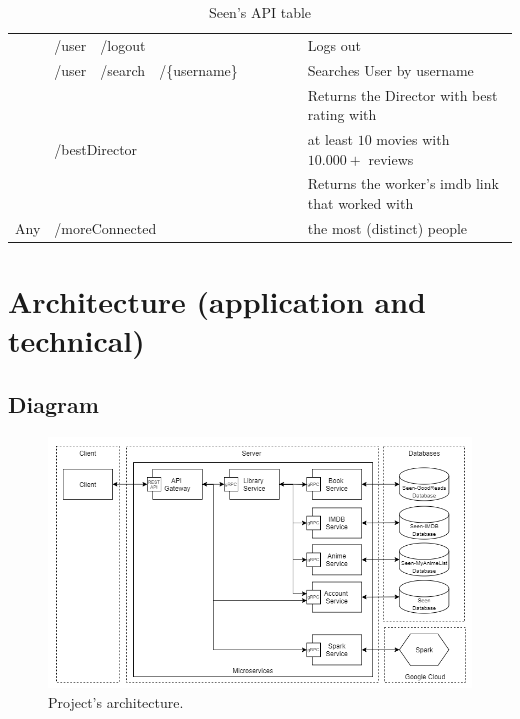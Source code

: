 \documentclass[oneside]{article}
\newcommand{\xmark}{\ding{53}} %
\begin{document}
\begin{table}[H]
\begin{adjustbox}{width=1.4\textwidth}
\begin{tabular}{ c|l l l l|c|c|c|c|l }
    & /user & \multicolumn{3}{l|}{/logout} &
    \xmark & & & &
    Logs out
    \\ \hhline{-|----|-|-|-|-|~}
    & /user & /search & \multicolumn{2}{l|}{/\{username\}} &
    \xmark & & & &
    Searches User by username
    \\ 
    & \multicolumn{4}{l|}{} &
     & & & &
    Returns the Director with best rating with \\
    & \multicolumn{4}{l|}{\multirow{-2}{*}{/bestDirector}} &
    \multirow{-2}{*}{\xmark}
     & & & &
    at least $10$ movies with $10.000+$ reviews
    \\ 
    & \multicolumn{4}{l|}{} &
     & & & &
    Returns the worker's imdb link that worked with \\
    \multirow{-5}{*}{Any} 
    & \multicolumn{4}{l|}{\multirow{-2}{*}{/moreConnected}} &
    \multirow{-2}{*}{\xmark} & & & &
    the most (distinct) people
  \end{tabular}
  \end{adjustbox}
  \caption{Seen's API table}
\end{table}

\section{Architecture (application and technical)}
\label{sec:architecture}
  \subsection{Diagram}
  \begin{figure}[H]
    \centering
    \includegraphics[width=\textwidth]{ CloudNativeAppArchitecture.png }
    \caption{Project's architecture.}
    \label{img:architecture}
  \end{figure}
\end{document}
